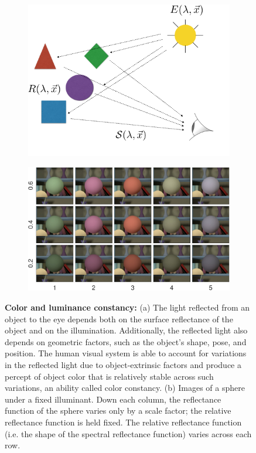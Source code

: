 \documentclass{jov}
\begin{document}
\begin{figure}
\centering
\begin{subfigure}{0.4 \textwidth}
	\centering
	\caption{}
        \includegraphics[width=\textwidth]{../FiguresDraft5/Figure1/Figure1_a.png}
        \label{fig:introSchematic}
    \end{subfigure}
    \begin{subfigure}{0.55 \textwidth}   
        \caption{}    
        \includegraphics[width=\textwidth]{../FiguresDraft5/Figure1/Figure1_b.pdf}
        \label{fig:introExampleFigure}
    \end{subfigure}
    \label{introFigure}
    \caption{{\bf Color and luminance constancy:} (a)  The light reflected from an object to the eye depends both on the surface reflectance of the object and on the illumination. Additionally, the reflected light also depends on geometric factors, such as the object's shape, pose, and position. The human visual system is able to account for variations in the reflected light due to object-extrinsic factors and produce a percept of object color that is relatively stable across such variations, an ability called color constancy. (b) Images of a sphere under a fixed illuminant.  Down each column, the reflectance function of the sphere varies only by a scale factor; the relative reflectance function is held fixed.  The relative reflectance function (i.e. the shape of the spectral reflectance function) varies across each row.
}
\end{figure}
\end{document}
